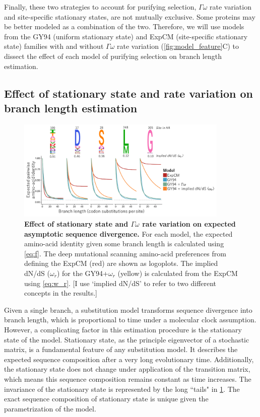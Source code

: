\documentclass[11pt]{article}
\newcommand\skhcomment[1]{{\color{cyan}[#1]}}
\begin{document}
Finally, these two strategies to account for purifying selection, $\Gamma\omega$ rate variation and site-specific stationary states, are not mutually exclusive. 
Some proteins may be better modeled as a combination of the two. 
Therefore, we will use models from the GY94 (uniform stationary state) and ExpCM (site-specific stationary state) families with and without $\Gamma\omega$ rate variation (\ref{fig:model_feature}C) to dissect the effect of each model of purifying selection on branch length estimation. 

\subsection*{Effect of stationary state and rate variation on branch length estimation}

\begin{figure}[H]
\centerline{\includegraphics[width=0.90\textwidth]{figures/decay.pdf}}
\caption{\label{fig:decay}
\textbf{Effect of stationary state and $\Gamma\omega$ rate variation on expected asymptotic sequence divergence.}
For each model, the expected amino-acid identity given some branch length is calculated using \ref{eq:f}. 
The deep mutational scanning amino-acid preferences from \cite{doud2016accurate} defining the ExpCM (red) are shown as logoplots. 
The implied dN/dS ($\omega_r$) for the GY94+$\omega_r$ (yellow) is calculated from the ExpCM using \ref{eq:w_r}. 
\skhcomment{I use `implied dN/dS' to refer to two different concepts in the results.}
}
\end{figure}

Given a single branch, a substitution model transforms sequence divergence into branch length, which is proportional to time under a molecular clock assumption. 
However, a complicating factor in this estimation procedure is the stationary state of the model. 
Stationary state, as the principle eigenvector of a stochastic matrix, is a fundamental feature of any substitution model. 
It describes the expected sequence composition after a very long evolutionary time. 
Additionally, the stationary state does not change under application of the transition matrix, which means this sequence composition remains constant as time increases. 
The invariance of the stationary state is represented by the long ``tails" in \ref{fig:decay}. 
The exact sequence composition of stationary state is unique given the parametrization of the model. 
\end{document}
